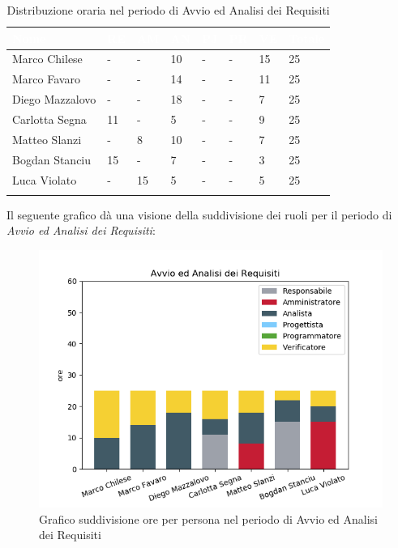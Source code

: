 \begin{longtable}{|C{.30\textwidth}|C{.06\textwidth}|C{.06\textwidth}|C{.06\textwidth} | C{.06\textwidth}| C{.06\textwidth} | C{.06\textwidth} | C{.10\textwidth} |}
\hline
{}	\textbf{\textcolor{white}{Nome}} & \textbf{\textcolor{white}{RE}} & \textbf{\textcolor{white}{AM}} & \textbf{\textcolor{white}{AN}} & \textbf{\textcolor{white}{PJ}} & \textbf{\textcolor{white}{PR}} & \textbf{\textcolor{white}{VE}} & \textbf{\textcolor{white}{Totale}}\\
\hline 
Marco Chilese & - & - & 10 & - & - & 15 & 25 \\
\hline
{}Marco Favaro & - & - & 14 & - & - & 11 & 25 \\
\hline
Diego Mazzalovo & - & - & 18 & - & - & 7 & 25 \\
\hline
{}Carlotta Segna & 11 & - & 5 & - & - & 9 & 25 \\
\hline
Matteo Slanzi & - & 8 & 10 & - & - & 7 & 25 \\
\hline
{}Bogdan Stanciu & 15 & - & 7 & - & - & 3 & 25\\
\hline
Luca Violato & - & 15 & 5 & - & - & 5 & 25 \\
\hline


\caption{Distribuzione oraria nel periodo di Avvio ed Analisi dei Requisiti}
\label{tab:dist oraria aar}
\end{longtable}

Il seguente grafico dà una visione della suddivisione dei ruoli per il periodo di \textit{Avvio ed Analisi dei Requisiti}:

\begin{figure}[H]
	\centering
  		\includegraphics[width=1\linewidth]{./images/fig_aar.png}
  		\caption{Grafico suddivisione ore per persona nel periodo di Avvio ed Analisi dei Requisiti}
  		\label{fig:grafico suddivione ruoli aar}
\end{figure}




